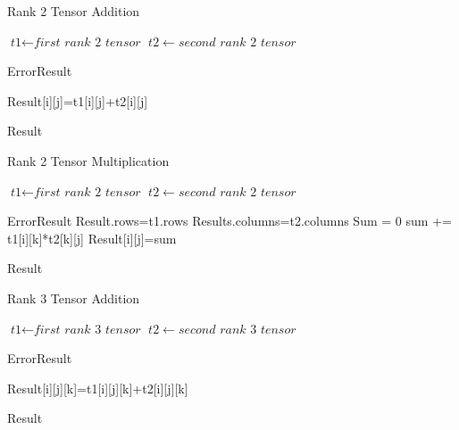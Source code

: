 \documentclass[journal,10pt]{IEEEtran}
\begin{document}
\begin{algorithm}
\caption{Rank 2 Tensor Addition}\label{euclid}
\begin{algorithmic}[1]
\State $\textit{t1} \gets \textit{first rank 2 tensor}$
\State $t2 \gets \textit{second rank 2 tensor}$

 \Return ErrorResult
\EndIf
{}

Result[i][j]=t1[i][j]+t2[i][j]

\EndFor
\EndFor
\Return Result


\EndFunction
\end{algorithmic}
\end{algorithm}

\begin{algorithm}
\caption{Rank 2 Tensor Multiplication}\label{euclid}
\begin{algorithmic}[1]
\State $\textit{t1} \gets \textit{first rank 2 tensor}$
\State $t2 \gets \textit{second rank 2 tensor}$

 \Return ErrorResult
\EndIf
Result.rows=t1.rows
Results.columns=t2.columns
Sum = 0
\For{}
sum += t1[i][k]*t2[k][j]
\EndFor
Result[i][j]=sum


\EndFor
\EndFor
\Return Result


\EndFunction
\end{algorithmic}
\end{algorithm}


\begin{algorithm}
\caption{Rank 3 Tensor Addition}\label{euclid}
\begin{algorithmic}[1]
\State $\textit{t1} \gets \textit{first rank 3 tensor}$
\State $t2 \gets \textit{second rank 3 tensor}$

 \Return ErrorResult
\EndIf
{}

Result[i][j][k]=t1[i][j][k]+t2[i][j][k]


\EndFor
\EndFor
\EndFor
\Return Result


\EndFunction
\end{algorithmic}
\end{algorithm}
\end{document}

